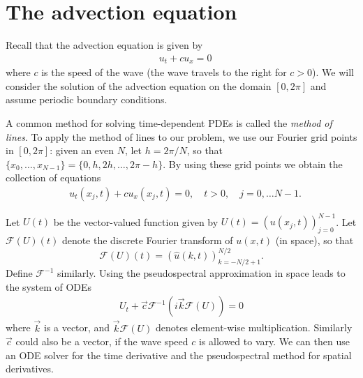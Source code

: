 \section*{The advection equation}
Recall that the advection equation is given by
\begin{align}
&{ }u_t + cu_x = 0
\end{align}
where $c$ is the speed of the wave (the wave travels to the right for $c > 0$).
We will consider the solution of the advection equation on the domain $[0,2\pi]$ and assume periodic boundary conditions.

A common method for solving time-dependent PDEs is called the \textit{method of lines}.
To apply the method of lines to our problem, we use our Fourier grid points in $[0,2\pi]$: given an even $N$, let $h = 2\pi/N$, so that $\{x_0,\ldots,x_{N-1}\} = \{0,h,2h,\ldots,2\pi-h\}$.
By using these grid points we obtain the collection of equations
\begin{align}
&{ }u_t(x_j,t) + cu_x(x_j,t) = 0, \quad t >0, \quad j = 0, \ldots N-1. \label{spectral2:method_oflines}
\end{align}

Let $U(t)$ be the vector-valued function given by $U(t) = (u(x_j,t))_{j=0}^{N-1}$.
Let $\mathcal{F}(U)(t)$ denote the discrete Fourier transform of $u(x,t)$ (in space), so that 
\[
\mathcal{F}(U)(t) = (\hat{u}(k,t))_{k=-N/2+1}^{N/2}.
\]
Define $\mathcal{F}^{-1}$ similarly.
Using the pseudospectral approximation in space leads to the system of ODEs
\begin{align}
	U_t +  \vec{c}\mathcal{F}^{-1}\left(i\vec{k}\mathcal{F}(U) \right) = 0
\end{align}
where $\vec{k}$ is a vector, and $\vec{k}\mathcal{F}(U) $ denotes element-wise multiplication. 
Similarly $\vec{c}$ could also be a vector, if the wave speed $c$ is allowed to vary. We can then use an ODE solver for the time derivative and the pseudospectral method for spatial derivatives.

